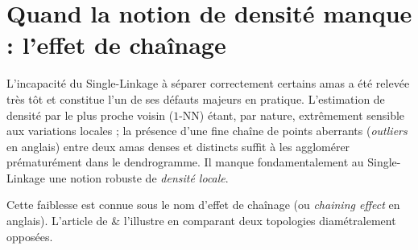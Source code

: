 

\section{Quand la notion de densité manque : l'effet de chaînage}

L'incapacité du Single-Linkage à séparer correctement certains amas a été relevée très tôt et constitue l'un de ses défauts majeurs en pratique. L'estimation de densité par le plus proche voisin ($1$-NN) étant, par nature, extrêmement sensible aux variations locales ; la présence d'une fine chaîne de points aberrants (\emph{outliers} en anglais) entre deux amas denses et distincts suffit à les agglomérer prématurément dans le dendrogramme. Il manque fondamentalement au Single-Linkage une notion robuste de \emph{densité locale}.


Cette faiblesse est connue sous le nom d'effet de chaînage (ou \emph{chaining effect} en anglais). L'article de  \&  \cite{CarlssonMemoli2010} l'illustre en comparant deux topologies diamétralement opposées.

